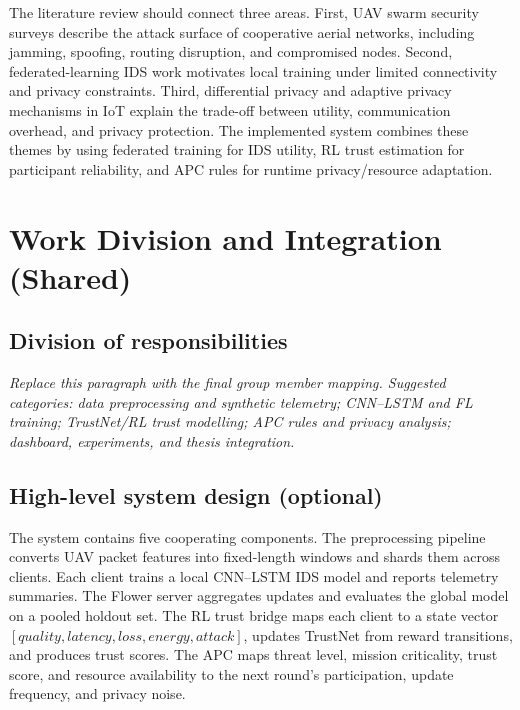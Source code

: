 \documentclass[11pt,a4paper,oneside]{report}
\begin{document}
The literature review should connect three areas. First, UAV swarm security
surveys describe the attack surface of cooperative aerial networks, including
jamming, spoofing, routing disruption, and compromised nodes. Second,
federated-learning IDS work motivates local training under limited connectivity
and privacy constraints. Third, differential privacy and adaptive privacy
mechanisms in IoT explain the trade-off between utility, communication overhead,
and privacy protection. The implemented system combines these themes by using
federated training for IDS utility, RL trust estimation for participant
reliability, and APC rules for runtime privacy/resource adaptation.

\chapter{Work Division and Integration (Shared)}
\label{ch:division}

\section{Division of responsibilities}
\textit{Replace this paragraph with the final group member mapping. Suggested
categories: data preprocessing and synthetic telemetry; CNN--LSTM and FL
training; TrustNet/RL trust modelling; APC rules and privacy analysis;
dashboard, experiments, and thesis integration.}

\section{High-level system design (optional)}
The system contains five cooperating components. The preprocessing pipeline
converts UAV packet features into fixed-length windows and shards them across
clients. Each client trains a local CNN--LSTM IDS model and reports telemetry
summaries. The Flower server aggregates updates and evaluates the global model
on a pooled holdout set. The RL trust bridge maps each client to a state vector
\([quality, latency, loss, energy, attack]\), updates TrustNet from reward
transitions, and produces trust scores. The APC maps threat level, mission
criticality, trust score, and resource availability to the next round's
participation, update frequency, and privacy noise.
\end{document}
